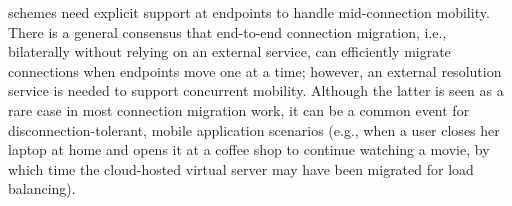 
{\Logcen} schemes need explicit  support at endpoints to handle mid-connection mobility. There is a general consensus \cite{Migrate,ECCP,TCP-R} that end-to-end connection migration, i.e., bilaterally without relying on an external service, can efficiently migrate connections when endpoints move one at a time; however, an external resolution service is needed to support concurrent mobility. Although the latter is seen as a rare case in most connection migration work, it can be a common event for disconnection-tolerant, mobile application scenarios (e.g., when a user closes her laptop at home and opens it at a coffee shop to continue watching a movie, by which time the cloud-hosted virtual server may have been migrated for load balancing).

